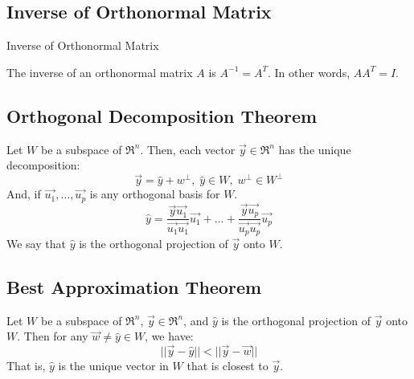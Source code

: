 \subsection{Inverse of Orthonormal Matrix}
\begin{theorem} Inverse of Orthonormal Matrix

The inverse of an orthonormal matrix \(A\) is \(A^{-1}=A^T\). In other words, \(A A^T = I\).
\end{theorem}

\subsection{Orthogonal Decomposition Theorem}
\begin{theorem}
    Let \(W\) be a subspace of \(\Re^n\). Then, each vector \(\Vec{y}\in \Re^n\) has the unique decomposition:
    \[\Vec{y}=\hat{y}+w^\perp, \; \hat{y}\in W, \; w^\perp \in W^\perp\]
    And, if \(\Vec{u_1},\dots,\Vec{u_p}\) is any orthogonal basis for \(W\).
    \[\hat{y}=\frac{\Vec{y}\Vec{u_1}}{\Vec{u_1}\Vec{u_1}}\Vec{u_1} + \dots + \frac{\Vec{y}\Vec{u_p}}{\Vec{u_p}\Vec{u_p}}\Vec{u_p}\]
    We say that \(\hat{y}\) is the orthogonal projection of \(\Vec{y}\) onto \(W\).
\end{theorem}

\subsection{Best Approximation Theorem}
\begin{theorem}
    Let \(W\) be a subspace of \(\Re^n\), \(\Vec{y}\in\Re^n\), and \(\hat{y}\) is the orthogonal projection of \(\Vec{y}\) onto \(W\). Then for any \(\Vec{w}\ne \hat{y} \in W\), we have:
    \[||\Vec{y}-\hat{y}|| < ||\Vec{y}-\Vec{w}||\]
    That is, \(\hat{y}\) is the unique vector in \(W\) that is closest to \(\Vec{y}\).
\end{theorem}